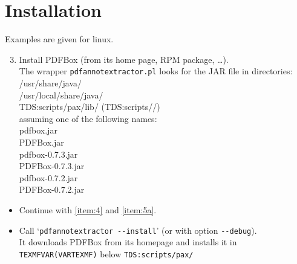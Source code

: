 \documentclass[pagesize=auto, parskip=half, fontsize=12pt, DIV=13]{scrartcl}
\newcommand*{\opt}[1]{\texttt{#1}}
\begin{document}
\section{Installation}

Examples are given for linux.

\begin{enumerate}
\setcounter{enumi}{2}
\item \label{item:3}
  Install PDFBox (from its home page, RPM package, \dots). \\
  The wrapper \texttt{pdfannotextractor.pl} looks for the JAR file in directories: \\
  \begingroup
  \ttfamily
  \null\quad /usr/share/java/ \\
  \null\quad /usr/local/share/java/ \\
  \null\quad TDS:scripts/pax/lib/ (TDS:scripts//) \\
  \endgroup
  assuming one of the following names: \\
  \begingroup
  \ttfamily
  \null\quad pdfbox.jar \\
  \null\quad PDFBox.jar \\
  \null\quad pdfbox-0.7.3.jar \\
  \null\quad PDFBox-0.7.3.jar \\
  \null\quad pdfbox-0.7.2.jar \\
  \null\quad PDFBox-0.7.2.jar
  \endgroup
\end{enumerate}


\begin{itemize}
\item Continue with \ref{item:4} and \ref{item:5a}.
\item Call `\verb+pdfannotextractor --install+' (or with option \opt{-{}-debug}). \\
  It downloads PDFBox from its homepage and installs it
  in \texttt{TEXMFVAR(VARTEXMF)} below \texttt{TDS:scripts/pax/}
\end{itemize}
\end{document}
